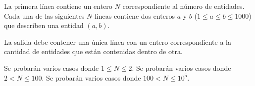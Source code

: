 \documentclass{oci}
\begin{document}
\begin{inputDescription}
  La primera línea contiene un entero $N$ correspondiente al número de entidades.
  Cada una de las siguientes $N$ líneas contiene dos enteros $a$ y $b$ ($1\leq
  a\leq b \leq 1000$) que describen una entidad $(a,b)$.
\end{inputDescription}

\begin{outputDescription}
  La salida debe contener una única línea con un entero correspondiente a la cantidad de
  entidades que están contenidas dentro de otra.
\end{outputDescription}

\begin{scoreDescription}
   Se probarán varios casos donde $1\leq N\leq 2$.
   Se probarán varios casos donde $2< N \leq 100$.
   Se probarán varios casos donde $100< N \leq 10^5$.
\end{scoreDescription}

\begin{sampleDescription}
\end{sampleDescription}
\end{document}
